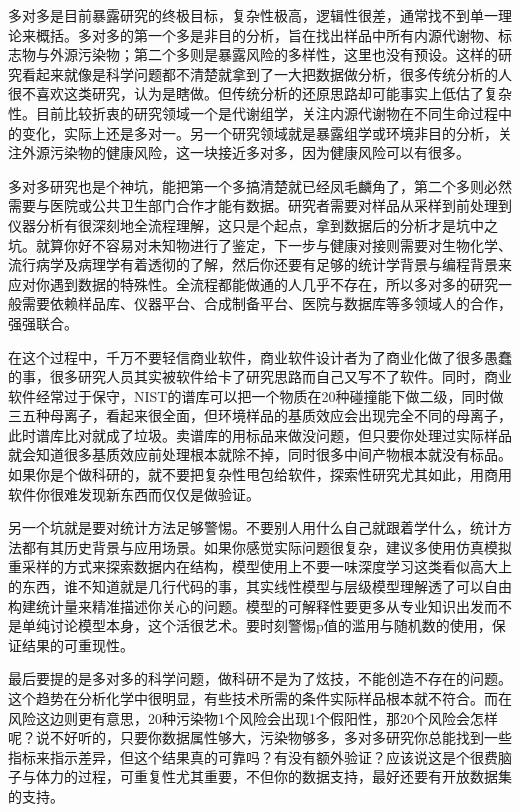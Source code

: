 \documentclass[
]{book}
\begin{document}
多对多是目前暴露研究的终极目标，复杂性极高，逻辑性很差，通常找不到单一理论来概括。多对多的第一个多是非目的分析，旨在找出样品中所有内源代谢物、标志物与外源污染物；第二个多则是暴露风险的多样性，这里也没有预设。这样的研究看起来就像是科学问题都不清楚就拿到了一大把数据做分析，很多传统分析的人很不喜欢这类研究，认为是瞎做。但传统分析的还原思路却可能事实上低估了复杂性。目前比较折衷的研究领域一个是代谢组学，关注内源代谢物在不同生命过程中的变化，实际上还是多对一。另一个研究领域就是暴露组学或环境非目的分析，关注外源污染物的健康风险，这一块接近多对多，因为健康风险可以有很多。

多对多研究也是个神坑，能把第一个多搞清楚就已经凤毛麟角了，第二个多则必然需要与医院或公共卫生部门合作才能有数据。研究者需要对样品从采样到前处理到仪器分析有很深刻地全流程理解，这只是个起点，拿到数据后的分析才是坑中之坑。就算你好不容易对未知物进行了鉴定，下一步与健康对接则需要对生物化学、流行病学及病理学有着透彻的了解，然后你还要有足够的统计学背景与编程背景来应对你遇到数据的特殊性。全流程都能做通的人几乎不存在，所以多对多的研究一般需要依赖样品库、仪器平台、合成制备平台、医院与数据库等多领域人的合作，强强联合。

在这个过程中，千万不要轻信商业软件，商业软件设计者为了商业化做了很多愚蠢的事，很多研究人员其实被软件给卡了研究思路而自己又写不了软件。同时，商业软件经常过于保守，NIST的谱库可以把一个物质在20种碰撞能下做二级，同时做三五种母离子，看起来很全面，但环境样品的基质效应会出现完全不同的母离子，此时谱库比对就成了垃圾。卖谱库的用标品来做没问题，但只要你处理过实际样品就会知道很多基质效应前处理根本就除不掉，同时很多中间产物根本就没有标品。如果你是个做科研的，就不要把复杂性甩包给软件，探索性研究尤其如此，用商用软件你很难发现新东西而仅仅是做验证。

另一个坑就是要对统计方法足够警惕。不要别人用什么自己就跟着学什么，统计方法都有其历史背景与应用场景。如果你感觉实际问题很复杂，建议多使用仿真模拟重采样的方式来探索数据内在结构，模型使用上不要一味深度学习这类看似高大上的东西，谁不知道就是几行代码的事，其实线性模型与层级模型理解透了可以自由构建统计量来精准描述你关心的问题。模型的可解释性要更多从专业知识出发而不是单纯讨论模型本身，这个活很艺术。要时刻警惕p值的滥用与随机数的使用，保证结果的可重现性。

最后要提的是多对多的科学问题，做科研不是为了炫技，不能创造不存在的问题。这个趋势在分析化学中很明显，有些技术所需的条件实际样品根本就不符合。而在风险这边则更有意思，20种污染物1个风险会出现1个假阳性，那20个风险会怎样呢？说不好听的，只要你数据属性够大，污染物够多，多对多研究你总能找到一些指标来指示差异，但这个结果真的可靠吗？有没有额外验证？应该说这是个很费脑子与体力的过程，可重复性尤其重要，不但你的数据支持，最好还要有开放数据集的支持。
\end{document}
